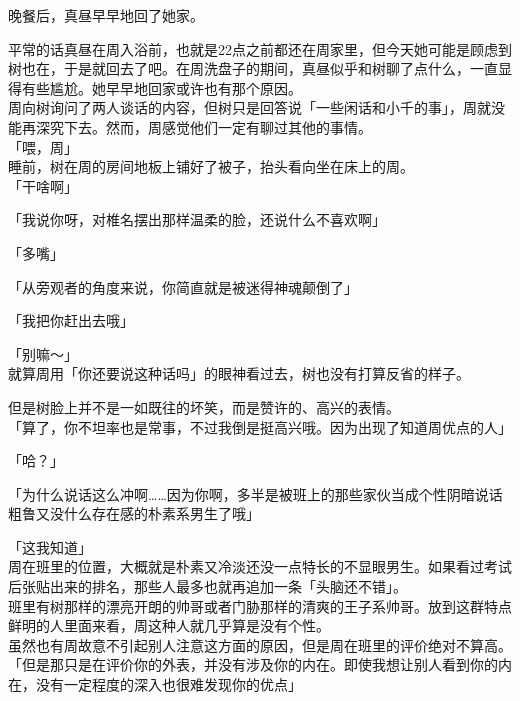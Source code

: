 \vspace{2\baselineskip}

晚餐后，真昼早早地回了她家。

平常的话真昼在周入浴前，也就是22点之前都还在周家里，但今天她可能是顾虑到树也在，于是就回去了吧。在周洗盘子的期间，真昼似乎和树聊了点什么，一直显得有些尴尬。她早早地回家或许也有那个原因。\\

周向树询问了两人谈话的内容，但树只是回答说「一些闲话和小千的事」，周就没能再深究下去。然而，周感觉他们一定有聊过其他的事情。\\

「喂，周」\\

睡前，树在周的房间地板上铺好了被子，抬头看向坐在床上的周。\\

「干啥啊」

「我说你呀，对椎名摆出那样温柔的脸，还说什么不喜欢啊」

「多嘴」

「从旁观者的角度来说，你简直就是被迷得神魂颠倒了」

「我把你赶出去哦」

「别嘛～」\\

就算周用「你还要说这种话吗」的眼神看过去，树也没有打算反省的样子。

但是树脸上并不是一如既往的坏笑，而是赞许的、高兴的表情。\\

「算了，你不坦率也是常事，不过我倒是挺高兴哦。因为出现了知道周优点的人」

「哈？」

「为什么说话这么冲啊……因为你啊，多半是被班上的那些家伙当成个性阴暗说话粗鲁又没什么存在感的朴素系男生了哦」

「这我知道」\\

周在班里的位置，大概就是朴素又冷淡还没一点特长的不显眼男生。如果看过考试后张贴出来的排名，那些人最多也就再追加一条「头脑还不错」。\\

班里有树那样的漂亮开朗的帅哥或者门胁那样的清爽的王子系帅哥。放到这群特点鲜明的人里面来看，周这种人就几乎算是没有个性。\\

虽然也有周故意不引起别人注意这方面的原因，但是周在班里的评价绝对不算高。\\

「但是那只是在评价你的外表，并没有涉及你的内在。即使我想让别人看到你的内在，没有一定程度的深入也很难发现你的优点」\\

